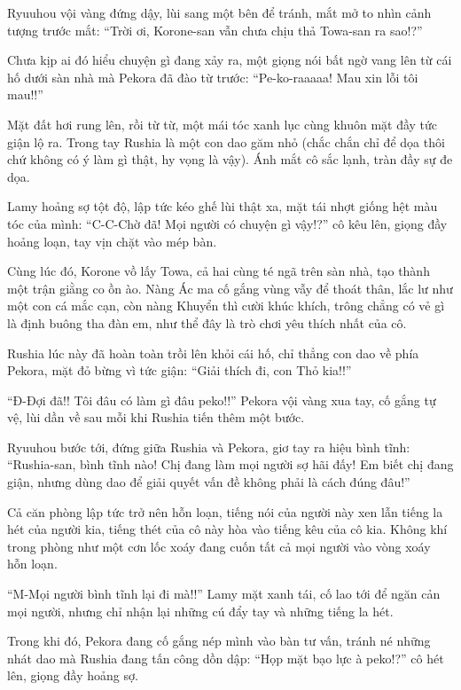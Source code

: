 \documentclass[../main.tex]{subfiles}
\begin{document}
Ryuuhou vội vàng đứng dậy, lùi sang một bên để tránh, mắt mở to nhìn cảnh tượng trước mắt: ``Trời ơi, Korone-san vẫn chưa chịu thả Towa-san ra sao!?''

Chưa kịp ai đó hiểu chuyện gì đang xảy ra, một giọng nói bất ngờ vang lên từ cái hố dưới sàn nhà mà Pekora đã đào từ trước: ``Pe-ko-raaaaa! Mau xin lỗi tôi mau!!''

Mặt đất hơi rung lên, rồi từ từ, một mái tóc xanh lục cùng khuôn mặt đầy tức giận lộ ra. Trong tay Rushia là một con dao găm nhỏ (chắc chắn chỉ để dọa thôi chứ không có ý làm gì thật, hy vọng là vậy). Ánh mắt cô sắc lạnh, tràn đầy sự đe dọa.


Lamy hoảng sợ tột độ, lập tức kéo ghế lùi thật xa, mặt tái nhợt giống hệt màu tóc của mình: ``C-C-Chờ đã! Mọi người có chuyện gì vậy!?'' cô kêu lên, giọng đầy hoảng loạn, tay vịn chặt vào mép bàn.

Cùng lúc đó, Korone vồ lấy Towa, cả hai cùng té ngã trên sàn nhà, tạo thành một trận giằng co ồn ào. Nàng Ác ma cố gắng vùng vẫy để thoát thân, lắc lư như một con cá mắc cạn, còn nàng Khuyển thì cười khúc khích, trông chẳng có vẻ gì là định buông tha đàn em, như thể đây là trò chơi yêu thích nhất của cô.

Rushia lúc này đã hoàn toàn trồi lên khỏi cái hố, chỉ thẳng con dao về phía Pekora, mặt đỏ bừng vì tức giận: ``Giải thích đi, con Thỏ kia!!''

``Đ-Đợi đã!! Tôi đâu có làm gì đâu peko!!'' Pekora vội vàng xua tay, cố gắng tự vệ, lùi dần về sau mỗi khi Rushia tiến thêm một bước.

Ryuuhou bước tới, đứng giữa Rushia và Pekora, giơ tay ra hiệu bình tĩnh: ``Rushia-san, bình tĩnh nào! Chị đang làm mọi người sợ hãi đấy! Em biết chị đang giận, nhưng dùng dao để giải quyết vấn đề không phải là cách đúng đâu!''

Cả căn phòng lập tức trở nên hỗn loạn, tiếng nói của người này xen lẫn tiếng la hét của người kia, tiếng thét của cô này hòa vào tiếng kêu của cô kia. Không khí trong phòng như một cơn lốc xoáy đang cuốn tất cả mọi người vào vòng xoáy hỗn loạn.

``M-Mọi người bình tĩnh lại đi mà!!'' Lamy mặt xanh tái, cố lao tới để ngăn cản mọi người, nhưng chỉ nhận lại những cú đẩy tay và những tiếng la hét.

Trong khi đó, Pekora đang cố gắng nép mình vào bàn tư vấn, tránh né những nhát dao mà Rushia đang tấn công dồn dập: ``Họp mặt bạo lực à peko!?'' cô hét lên, giọng đầy hoảng sợ.
\end{document}

